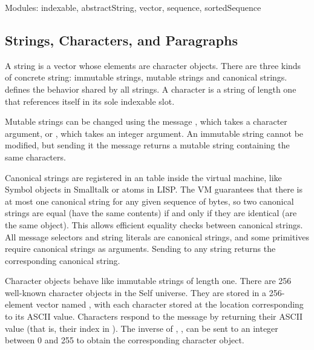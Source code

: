 \documentclass[letterpaper,10pt,english]{sphinxmanual}
\begin{document}
Modules: indexable, abstractString, vector, sequence, sortedSequence


\subsection{Strings, Characters, and Paragraphs}
\label{\detokenize{collections:strings-characters-and-paragraphs}}
\begin{sphinxVerbatim}[commandchars=\\\{\}]
\end{sphinxVerbatim}

A string is a vector whose elements are character objects. There are three kinds of concrete string:
immutable strings, mutable strings and canonical strings.  defines the behavior
shared by all strings. A character is a string of length one that references itself in its sole indexable
slot.

Mutable strings can be changed using the message , which takes a character argument, or
, which takes an integer argument. An immutable string cannot be modified, but
sending it the  message returns a mutable string containing the same characters.

Canonical strings are registered in an table inside the virtual machine, like Symbol objects in
Smalltalk or atoms in LISP. The VM guarantees that there is at most one canonical string for any
given sequence of bytes, so two canonical strings are equal (have the same contents) if and only if
they are identical (are the same object). This allows efficient equality checks between canonical
strings. All message selectors and string literals are canonical strings, and some primitives require
canonical strings as arguments. Sending  to any string returns the corresponding
canonical string.

Character objects behave like immutable strings of length one. There are 256 well-known character
objects in the Self universe. They are stored in a 256-element vector named , with each
character stored at the location corresponding to its ASCII value. Characters respond to the message
 by returning their ASCII value (that is, their index in ). The inverse of ,
, can be sent to an integer between 0 and 255 to obtain the corresponding
character object.
\end{document}

